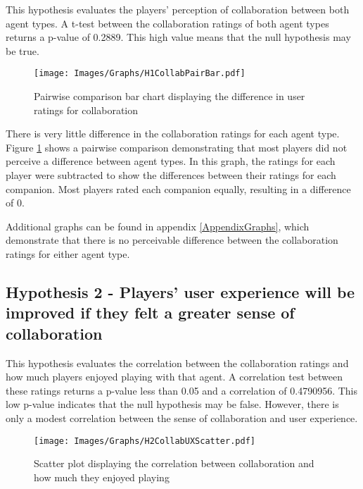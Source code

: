 \documentclass{IEEEtran}
\begin{document}
This hypothesis evaluates the players’ perception of collaboration between both agent types. A t-test between the collaboration ratings of both agent types returns a p-value of 0.2889. This high value means that the null hypothesis may be true.

\begin{figure}[!h]
  \centering
  \texttt{[image: Images/Graphs/H1CollabPairBar.pdf]}
  
\caption{Pairwise comparison bar chart displaying the difference in user ratings for collaboration}
\label{fig:H1CollabPairBar}
\end{figure}

There is very little difference in the collaboration ratings for each agent type. Figure \ref{fig:H1CollabPairBar} shows a pairwise comparison demonstrating that most players did not perceive a difference between agent types. In this graph, the ratings for each player were subtracted to show the differences between their ratings for each companion. Most players rated each companion equally, resulting in a difference of 0.

Additional graphs can be found in appendix \ref{AppendixGraphs}, which demonstrate that there is no perceivable difference between the collaboration ratings for either agent type.

\subsection{Hypothesis 2 - Players' user experience will be improved if they felt a greater sense of collaboration}


This hypothesis evaluates the correlation between the collaboration ratings and how much players enjoyed playing with that agent. A correlation test between these ratings returns a p-value less than 0.05 and a correlation of 0.4790956. This low p-value indicates that the null hypothesis may be false. However, there is only a modest correlation between the sense of collaboration and user experience.

\begin{figure}[!h]
  \centering
  \texttt{[image: Images/Graphs/H2CollabUXScatter.pdf]}
  
\caption{Scatter plot displaying the correlation between collaboration and how much they enjoyed playing}
\label{fig:H2CollabUXScatter}
\end{figure}
\end{document}

